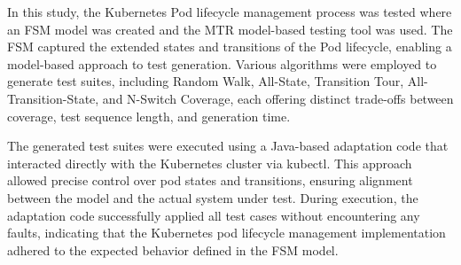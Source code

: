 \documentclass[main.tex]{subfiles}
\begin{document}
In this study, the Kubernetes Pod lifecycle management process was tested where an FSM model was created and the MTR model-based testing tool was used. The FSM captured the extended states and transitions of the Pod lifecycle, enabling a model-based approach to test generation. Various algorithms were employed to generate test suites, including Random Walk, All-State, Transition Tour, All-Transition-State, and N-Switch Coverage, each offering distinct trade-offs between coverage, test sequence length, and generation time.

The generated test suites were executed using a Java-based adaptation code that interacted directly with the Kubernetes cluster via kubectl. This approach allowed precise control over pod states and transitions, ensuring alignment between the model and the actual system under test. During execution, the adaptation code successfully applied all test cases without encountering any faults, indicating that the Kubernetes pod lifecycle management implementation adhered to the expected behavior defined in the FSM model.
\end{document}
